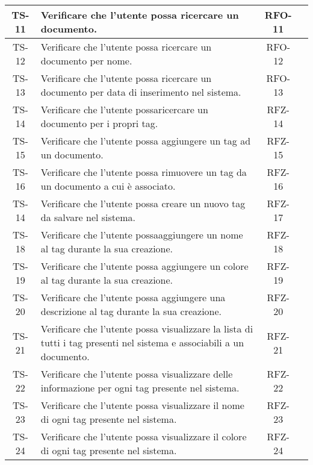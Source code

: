 \begin{xltabular}{\textwidth}{| c | X | c | c |}
    \hline
    TS-11 & Verificare che l’utente possa ricercare un documento. & RFO-11 & \textcolor{xmarkcolor}{} \\
    \hline
    TS-12 & Verificare che l’utente possa ricercare un documento per nome. & RFO-12 & \textcolor{xmarkcolor}{} \\
    \hline
    TS-13 & Verificare che l’utente possa ricercare un documento per data di inserimento nel sistema. & RFO-13 & \textcolor{xmarkcolor}{} \\
    \hline
    TS-14 & Verificare che l’utente possaricercare un documento per i propri tag. & RFZ-14 & \textcolor{xmarkcolor}{} \\
    \hline
    TS-15 & Verificare che l’utente possa aggiungere un tag ad un documento. & RFZ-15 & \textcolor{xmarkcolor}{} \\
    \hline
    TS-16 & Verificare che l’utente possa rimuovere un tag da un documento a cui è associato. & RFZ-16 & \textcolor{xmarkcolor}{} \\
    \hline
    TS-14 & Verificare che l’utente possa creare un nuovo tag da salvare nel sistema. & RFZ-17 & \textcolor{xmarkcolor}{} \\
    \hline
    TS-18 & Verificare che l’utente possaaggiungere un nome al tag durante la sua creazione. & RFZ-18 & \textcolor{xmarkcolor}{} \\
    \hline
    TS-19 & Verificare che l’utente possa aggiungere un colore al tag durante la sua creazione. & RFZ-19 & \textcolor{xmarkcolor}{} \\
    \hline
    TS-20 & Verificare che l’utente possa aggiungere una descrizione al tag durante la sua creazione. & RFZ-20 & \textcolor{xmarkcolor}{} \\
    \hline
    TS-21 &  Verificare che l’utente possa visualizzare la lista di tutti i tag presenti nel sistema e associabili a un documento. & RFZ-21 & \textcolor{xmarkcolor}{} \\
    \hline
    TS-22 & Verificare che l'utente possa visualizzare delle informazione per ogni tag presente nel sistema. & RFZ-22 & \textcolor{xmarkcolor}{} \\
    \hline
    TS-23 & Verificare che l'utente possa visualizzare il nome di ogni tag presente nel sistema. & RFZ-23 & \textcolor{xmarkcolor}{} \\
    \hline
    TS-24 & Verificare che l’utente possa visualizzare il colore di ogni tag presente nel sistema. & RFZ-24 & \textcolor{xmarkcolor}{} \\

\end{xltabular}
